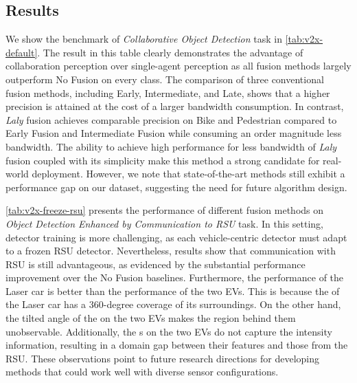 \subsection{Results}
We show the benchmark of \textit{Collaborative Object Detection} task in \autoref{tab:v2x-default}.
The result in this table clearly demonstrates the advantage of collaboration perception over single-agent perception as all fusion methods largely outperform No Fusion on every class.
The comparison of three conventional fusion methods, including Early, Intermediate, and Late, shows that a higher precision is attained at the cost of a larger bandwidth consumption.
In contrast, \textit{Laly} fusion achieves comparable precision on Bike and Pedestrian compared to Early Fusion and Intermediate Fusion while consuming an order magnitude less bandwidth.
The ability to achieve high performance for less bandwidth of \textit{Laly} fusion coupled with its simplicity make this method a strong candidate for real-world deployment. However, we note that state-of-the-art methods still exhibit a performance gap on our dataset, suggesting the need for future algorithm design. 


\autoref{tab:v2x-freeze-rsu} presents the performance of different fusion methods on \textit{Object Detection Enhanced by Communication to RSU} task. 
In this setting, detector training is more challenging, as each vehicle-centric detector must adapt to a frozen RSU detector. Nevertheless, results show that communication with RSU is still advantageous, as evidenced by the substantial performance improvement over the No Fusion baselines.
Furthermore, the performance of the Laser car is better than the performance of the two EVs.
This is because the \lidar of the Laser car has a 360-degree coverage of its surroundings.
On the other hand, the tilted angle of the \lidar on the two EVs makes the region behind them unobservable.
Additionally, the {\lidar}s on the two EVs do not capture the intensity information, resulting in a domain gap between their features and those from the RSU.
These observations point to future research directions for developing methods that could work well with diverse sensor configurations.

